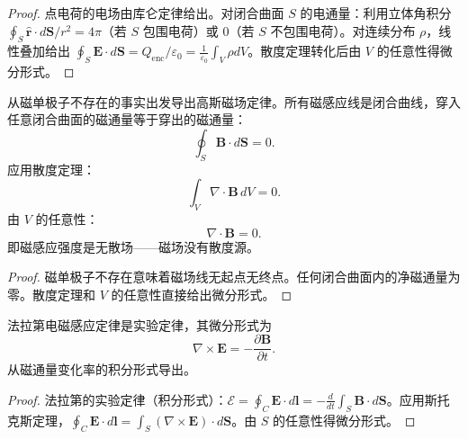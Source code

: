 \begin{proof}
点电荷的电场由库仑定律给出。对闭合曲面 $S$ 的电通量：利用立体角积分 $\oint_S \hat{\mathbf{r}}\cdot d\mathbf{S}/r^2 = 4\pi$（若 $S$ 包围电荷）或 $0$（若 $S$ 不包围电荷）。对连续分布 $\rho$，线性叠加给出 $\oint_S \mathbf{E}\cdot d\mathbf{S} = Q_{\text{enc}}/\varepsilon_0 = \frac{1}{\varepsilon_0}\int_V \rho dV$。散度定理转化后由 $V$ 的任意性得微分形式。
\end{proof}

\begin{theorem}[高斯磁场定律的导出]\label{thm:gauss_magnetic_derivation}
从磁单极子不存在的事实出发导出高斯磁场定律。所有磁感应线是闭合曲线，穿入任意闭合曲面的磁通量等于穿出的磁通量：
\[
\oint_S \mathbf{B} \cdot d\mathbf{S} = 0.
\]
应用散度定理：
\[
\int_V \nabla \cdot \mathbf{B} \, dV = 0.
\]
由 $V$ 的任意性：
\[
\boxed{\nabla \cdot \mathbf{B} = 0}.
\]
即磁感应强度是无散场——磁场没有散度源。
\end{theorem}

\begin{proof}
磁单极子不存在意味着磁场线无起点无终点。任何闭合曲面内的净磁通量为零。散度定理和 $V$ 的任意性直接给出微分形式。
\end{proof}

\begin{theorem}[法拉第定律的导出]\label{thm:faraday_derivation}
法拉第电磁感应定律是实验定律，其微分形式为
\[
\boxed{\nabla \times \mathbf{E} = -\frac{\partial \mathbf{B}}{\partial t}}.
\]
从磁通量变化率的积分形式导出。
\end{theorem}

\begin{proof}
法拉第的实验定律（积分形式）：$\mathcal{E} = \oint_C \mathbf{E}\cdot d\mathbf{l} = -\frac{d}{dt}\int_S \mathbf{B}\cdot d\mathbf{S}$。应用斯托克斯定理，$\oint_C \mathbf{E}\cdot d\mathbf{l} = \int_S (\nabla\times\mathbf{E})\cdot d\mathbf{S}$。由 $S$ 的任意性得微分形式。
\end{proof}

